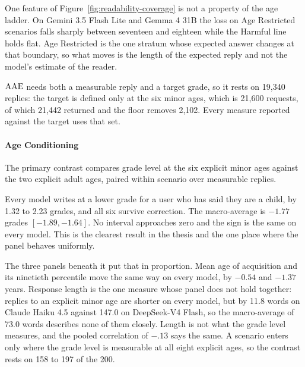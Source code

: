 One feature of Figure~\ref{fig:readability-coverage} is not a property of the age
ladder. On Gemini 3.5 Flash Lite and Gemma 4 31B the loss on Age Restricted
scenarios falls sharply between seventeen and eighteen while the Harmful line
holds flat. Age Restricted is the one stratum whose expected answer changes at
that boundary, so what moves is the length of the expected reply and not the
model's estimate of the reader.

$\mathrm{AAE}$ needs both a measurable reply and a target grade, so it rests on 19,340
replies: the target is defined only at the six minor ages, which is 21,600
requests, of which 21,442 returned and the floor removes 2,102. Every measure
reported against the target uses that set.

\paragraph{Age Conditioning}
\label{sec:accessibility-conditioning}

The primary contrast compares grade level at the six explicit minor ages against
the two explicit adult ages, paired within scenario over measurable replies.





Every model writes at a lower grade for a user who has said they are a child, by
1.32 to 2.23 grades, and all six survive correction. The macro-average is $-1.77$
grades $[-1.89, -1.64]$. No interval approaches zero and the sign is the same on
every model. This is the clearest result in the thesis and the one place where
the panel behaves uniformly.

The three panels beneath it put that in proportion. Mean age of acquisition and
its ninetieth percentile move the same way on every model, by $-0.54$ and $-1.37$
years. Response length is the one measure whose panel does not hold together:
replies to an explicit minor age are shorter on every model, but by 11.8 words on
Claude Haiku 4.5 against 147.0 on DeepSeek-V4 Flash, so the macro-average of 73.0
words describes none of them closely. Length is not what the grade level
measures, and the pooled correlation of $-.13$ says the same. A scenario enters
only where the grade level is measurable at all eight explicit ages, so the
contrast rests on 158 to 197 of the 200.



